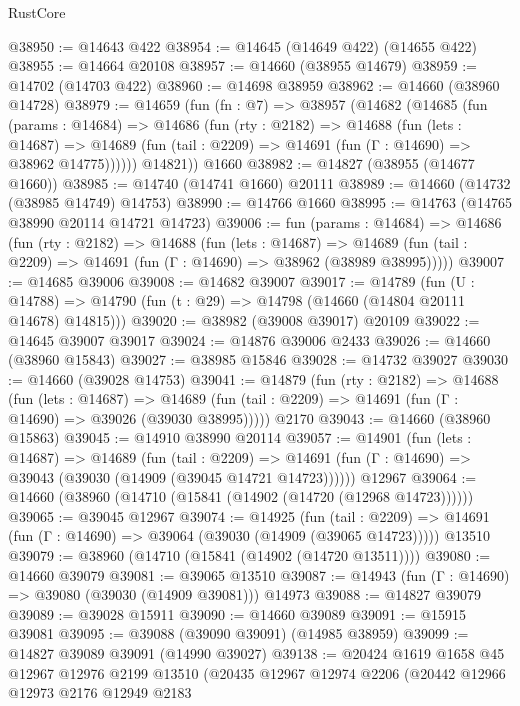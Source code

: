 \begin{lexlean}{RustCore}
\begin{coremodule}
@38950 := @14643 @422
@38954 := @14645 (@14649 @422) (@14655 @422)
@38955 := @14664 @20108
@38957 := @14660 (@38955 @14679)
@38959 := @14702 (@14703 @422)
@38960 := @14698 @38959
@38962 := @14660 (@38960 @14728)
@38979 := @14659
    (fun (fn : @7) =>
    @38957
      (@14682
        (@14685
          (fun (params : @14684) =>
          @14686
            (fun (rty : @2182) =>
            @14688
              (fun (lets : @14687) =>
              @14689 (fun (tail : @2209) => @14691 (fun (Γ : @14690) => @38962 @14775))))))
        @14821))
    @1660
@38982 := @14827 (@38955 (@14677 @1660))
@38985 := @14740 (@14741 @1660) @20111
@38989 := @14660 (@14732 (@38985 @14749) @14753)
@38990 := @14766 @1660
@38995 := @14763 (@14765 @38990 @20114 @14721 @14723)
@39006 := fun (params : @14684) =>
  @14686
    (fun (rty : @2182) =>
    @14688
      (fun (lets : @14687) =>
      @14689 (fun (tail : @2209) => @14691 (fun (Γ : @14690) => @38962 (@38989 @38995)))))
@39007 := @14685 @39006
@39008 := @14682 @39007
@39017 := @14789
    (fun (U : @14788) => @14790 (fun (t : @29) => @14798 (@14660 (@14804 @20111 @14678) @14815)))
@39020 := @38982 (@39008 @39017) @20109
@39022 := @14645 @39007 @39017
@39024 := @14876 @39006 @2433
@39026 := @14660 (@38960 @15843)
@39027 := @38985 @15846
@39028 := @14732 @39027
@39030 := @14660 (@39028 @14753)
@39041 := @14879
    (fun (rty : @2182) =>
    @14688
      (fun (lets : @14687) =>
      @14689 (fun (tail : @2209) => @14691 (fun (Γ : @14690) => @39026 (@39030 @38995)))))
    @2170
@39043 := @14660 (@38960 @15863)
@39045 := @14910 @38990 @20114
@39057 := @14901
    (fun (lets : @14687) =>
    @14689
      (fun (tail : @2209) =>
      @14691 (fun (Γ : @14690) => @39043 (@39030 (@14909 (@39045 @14721 @14723))))))
    @12967
@39064 := @14660 (@38960 (@14710 (@15841 (@14902 (@14720 (@12968 @14723))))))
@39065 := @39045 @12967
@39074 := @14925
    (fun (tail : @2209) => @14691 (fun (Γ : @14690) => @39064 (@39030 (@14909 (@39065 @14723)))))
    @13510
@39079 := @38960 (@14710 (@15841 (@14902 (@14720 @13511))))
@39080 := @14660 @39079
@39081 := @39065 @13510
@39087 := @14943 (fun (Γ : @14690) => @39080 (@39030 (@14909 @39081))) @14973
@39088 := @14827 @39079
@39089 := @39028 @15911
@39090 := @14660 @39089
@39091 := @15915 @39081
@39095 := @39088 (@39090 @39091) (@14985 @38959)
@39099 := @14827 @39089 @39091 (@14990 @39027)
@39138 := @20424
    @1619
    @1658
    @45
    @12967
    @12976
    @2199
    @13510
    (@20435
      @12967
      @12974
      @2206
      (@20442
        @12966
        @12973
        @2176
        @12949
        @2183

\end{coremodule}
\end{lexlean}
